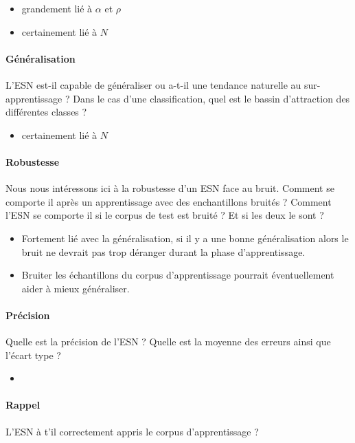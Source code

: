 \documentclass[12pt]{article}
\begin{document}
\begin{itemize}
\item grandement lié à $\alpha$ et $\rho$
\item certainement lié à $N$
\end{itemize}


\paragraph{Généralisation}
L'ESN est-il capable de généraliser ou a-t-il une tendance naturelle au sur-apprentissage ? Dans le cas d'une classification, quel est le bassin d'attraction des différentes classes ?

\begin{itemize}
\item certainement lié à $N$
\end{itemize}


\paragraph{Robustesse}
Nous nous intéressons ici à la robustesse d'un ESN face au bruit. Comment se comporte il après un apprentissage avec des enchantillons bruités ? Comment l'ESN se comporte il si le corpus de test est bruité ? Et si les deux le sont ?

\begin{itemize}
\item Fortement lié avec la généralisation, si il y a une bonne généralisation alors le bruit ne devrait pas trop déranger durant la phase d'apprentissage.
\item Bruiter les échantillons du corpus d'apprentissage pourrait éventuellement aider à mieux généraliser.
\end{itemize}


\paragraph{Précision}
Quelle est la précision de l'ESN ? Quelle est la moyenne des erreurs ainsi que l'écart type ?

\begin{itemize}
\item
\end{itemize}

\paragraph{Rappel}
L'ESN à t'il correctement appris le corpus d'apprentissage ?
\end{document}
